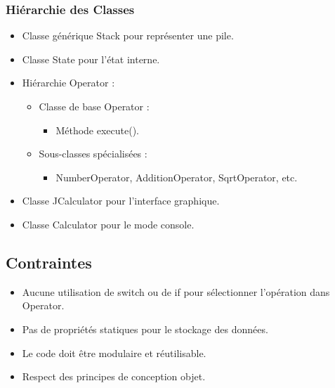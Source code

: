 \documentclass[12pt]{report}
\begin{document}
                \subsubsection*{Hiérarchie des Classes}
                    \begin{itemize}
                        \item Classe générique Stack pour représenter une pile.
                        \item Classe State pour l'état interne.
                        \item Hiérarchie Operator :
                        \begin{itemize}
                            \item Classe de base Operator :
                            \begin{itemize}
                                \item Méthode execute().
                            \end{itemize}

                            \item Sous-classes spécialisées :
                            \begin{itemize}
                                \item NumberOperator, AdditionOperator, SqrtOperator, etc.
                            \end{itemize}
                        \end{itemize}

                        \item Classe JCalculator pour l'interface graphique.
                        \item Classe Calculator pour le mode console.
                    \end{itemize}
            \subsection*{Contraintes}
                \begin{itemize}
                    \item Aucune utilisation de switch ou de if pour sélectionner l'opération dans Operator.
                    \item Pas de propriétés statiques pour le stockage des données.
                    \item Le code doit être modulaire et réutilisable.
                    \item Respect des principes de conception objet.
                \end{itemize}
\end{document}
